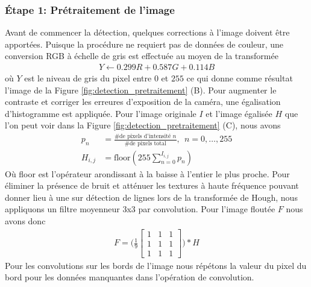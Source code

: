 \subsubsection{Étape 1: Prétraitement de l'image} Avant de commencer la détection, quelques corrections à l'image doivent être apportées. Puisque la procédure ne requiert pas de données de couleur, une conversion RGB à échelle de gris est effectuée au moyen de la transformée
\begin{align}
 Y \leftarrow 0.299 R + 0.587 G + 0.114 B
 \label{eq:rgb2gray}
\end{align}
où $Y$ est le niveau de gris du pixel entre $0$ et $255$ ce qui donne comme résultat l'image de la Figure \ref{fig:detection_pretraitement} (B). Pour augmenter le contraste et corriger les erreures d'exposition de la caméra, une égalisation d'histogramme est appliquée. Pour l'image originale $I$ et l'image égalisée $H$ que l'on peut voir dans la Figure \ref{fig:detection_pretraitement} (C), nous avons
\begin{align}
  p_n &= \frac{\text{\# de pixels d'intensité } n }{\text{\# de pixels total}}, \ \ n = 0, \ldots, 255 \\
  H_{i,j} &= \text{floor}(255 \sum_{n=0}^{I_{i,j}} p_n)
  \label{eq:egalisation_histogramme}
\end{align}
Où floor est l'opérateur arondissant à la baisse à l'entier le plus proche. Pour éliminer la présence de bruit et atténuer les textures à haute fréquence pouvant donner lieu à une sur détection de lignes lors de la transformée de Hough, nous appliquons un filtre moyenneur 3x3 par convolution. Pour l'image floutée $F$ nous avons donc
\begin{align}
  F = \Bigg(\frac{1}{9}
    \begin{bmatrix}
      1 & 1 & 1\\
      1 & 1 & 1\\
      1 & 1 & 1
    \end{bmatrix}
  \Bigg) * H
  \label{eq:boxfilter}
\end{align}
Pour les convolutions sur les bords de l'image nous répétons la valeur du pixel du bord pour les données manquantes dans l'opération de convolution.
